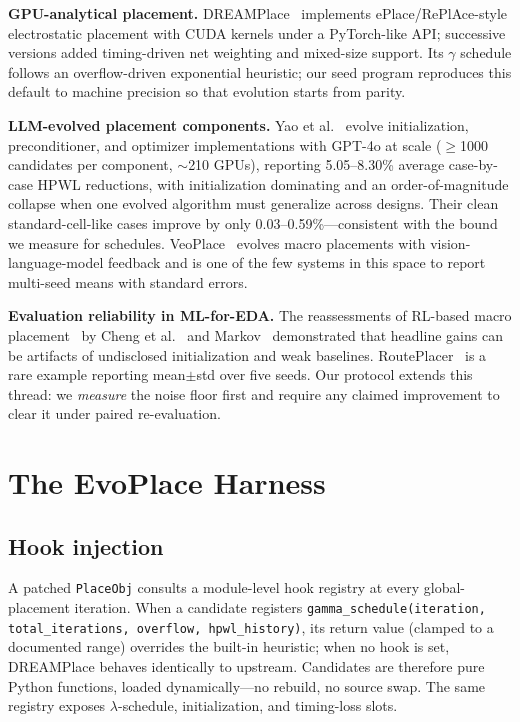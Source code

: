 \documentclass[conference]{IEEEtran}
\begin{document}
\textbf{GPU-analytical placement.} DREAMPlace~\cite{lin2019dreamplace}
implements ePlace/RePlAce-style electrostatic placement with CUDA kernels
under a PyTorch-like API; successive versions added timing-driven net
weighting and mixed-size support. Its $\gamma$ schedule follows an
overflow-driven exponential heuristic; our seed program reproduces this
default to machine precision so that evolution starts from parity.

\textbf{LLM-evolved placement components.} Yao et
al.~\cite{yao2025evolution} evolve initialization, preconditioner, and
optimizer implementations with GPT-4o at scale ($\geq$1000 candidates per
component, $\sim$210 GPUs), reporting 5.05--8.30\% average case-by-case
HPWL reductions, with initialization dominating and an order-of-magnitude
collapse when one evolved algorithm must generalize across designs. Their
clean standard-cell-like cases improve by only 0.03--0.59\%---consistent
with the bound we measure for schedules. VeoPlace~\cite{veoplace2026}
evolves macro placements with vision-language-model feedback and is one of
the few systems in this space to report multi-seed means with standard
errors.

\textbf{Evaluation reliability in ML-for-EDA.} The reassessments of
RL-based macro placement~\cite{mirhoseini2021graph} by Cheng et
al.~\cite{cheng2023assessment} and Markov~\cite{markov2023false}
demonstrated that headline gains can be artifacts of undisclosed
initialization and weak baselines. RoutePlacer~\cite{routeplacer2024} is a
rare example reporting mean$\pm$std over five seeds. Our protocol extends
this thread: we \emph{measure} the noise floor first and require any
claimed improvement to clear it under paired re-evaluation.

\section{The EvoPlace Harness}
\label{sec:system}

\subsection{Hook injection}
A patched \texttt{PlaceObj} consults a module-level hook registry at every
global-placement iteration. When a candidate registers
\texttt{gamma\_schedule(iteration, total\_iterations, overflow,
hpwl\_history)}, its return value (clamped to a documented range)
overrides the built-in heuristic; when no hook is set, DREAMPlace behaves
identically to upstream. Candidates are therefore pure Python functions,
loaded dynamically---no rebuild, no source swap. The same registry exposes
$\lambda$-schedule, initialization, and timing-loss slots.
\end{document}
